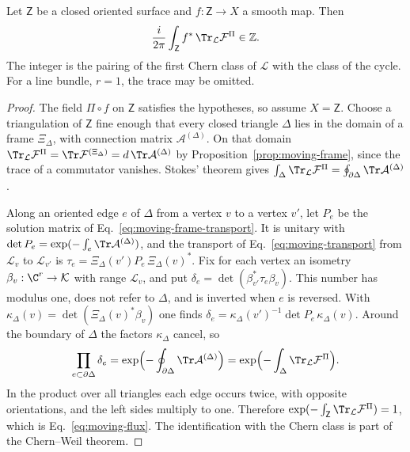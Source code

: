 \begin{corollary}
\label{cor:moving-flux}
Let $\mathsf Z$ be a closed oriented surface and $f:\mathsf Z\to X$ a smooth map. Then
\begin{equation}
 \frac{i}{2\pi}\int_{\mathsf Z}f^*\,\Tr_{\mathcal L}\mathcal F^\Pi\in\mathbb Z .
 \label{eq:moving-flux}
\end{equation}
The integer is the pairing of the first Chern class of $\mathcal L$ with the class of the cycle. For a line bundle, $r=1$, the trace may be omitted.
\end{corollary}
\begin{proof}
The field $\Pi\circ f$ on $\mathsf Z$ satisfies the hypotheses, so assume $X=\mathsf Z$. Choose a triangulation of $\mathsf Z$ fine enough that every closed triangle $\Delta$ lies in the domain of a frame $\Xi_\Delta$, with connection matrix $\mathcal A^{(\Delta)}$. On that domain $\Tr_{\mathcal L}\mathcal F^\Pi=\Tr\mathcal F^{(\Xi_\Delta)}=d\,\Tr\mathcal A^{(\Delta)}$ by Proposition~\ref{prop:moving-frame}, since the trace of a commutator vanishes. Stokes' theorem gives $\int_\Delta\Tr_{\mathcal L}\mathcal F^\Pi=\oint_{\partial\Delta}\Tr\mathcal A^{(\Delta)}$.

Along an oriented edge $e$ of $\Delta$ from a vertex $v$ to a vertex $v'$, let $P_e$ be the solution matrix of Eq.~\eqref{eq:moving-frame-transport}. It is unitary with $\det P_e=\exp(-\int_e\Tr\mathcal A^{(\Delta)})$, and the transport of Eq.~\eqref{eq:moving-transport} from $\mathcal L_v$ to $\mathcal L_{v'}$ is $\tau_e=\Xi_\Delta(v')P_e\,\Xi_\Delta(v)^*$. Fix for each vertex an isometry $\beta_v:\C^r\to\mathcal K$ with range $\mathcal L_v$, and put $\delta_e=\det(\beta_{v'}^*\tau_e\beta_v)$. This number has modulus one, does not refer to $\Delta$, and is inverted when $e$ is reversed. With $\kappa_\Delta(v)=\det(\Xi_\Delta(v)^*\beta_v)$ one finds $\delta_e=\kappa_\Delta(v')^{-1}\det P_e\,\kappa_\Delta(v)$. Around the boundary of $\Delta$ the factors $\kappa_\Delta$ cancel, so
\[
 \prod_{e\subset\partial\Delta}\delta_e=\exp\Bigl(-\oint_{\partial\Delta}\Tr\mathcal A^{(\Delta)}\Bigr)
   =\exp\Bigl(-\int_\Delta\Tr_{\mathcal L}\mathcal F^\Pi\Bigr).
\]
In the product over all triangles each edge occurs twice, with opposite orientations, and the left sides multiply to one. Therefore $\exp(-\int_{\mathsf Z}\Tr_{\mathcal L}\mathcal F^\Pi)=1$, which is Eq.~\eqref{eq:moving-flux}. The identification with the Chern class is part of the Chern--Weil theorem.
\end{proof}

